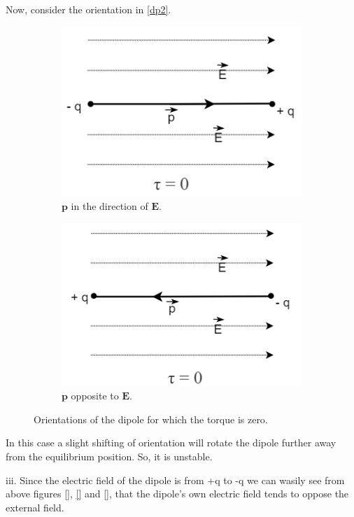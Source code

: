 Now, consider the orientation in \ref{dp2}. \\
\begin{figure}[h]
    \centering
    \begin{subfigure}[b]{0.45\textwidth}
    \centering
    \includegraphics[scale = 0.6]{figures/elecmag/dipoles1.png}
     \caption{$\bm{p}$ in the direction of $\bm{E}$.}
     \label{dp}
    \end{subfigure}
    \hfill
     \begin{subfigure}[b]{0.45\textwidth}
     \centering
    \includegraphics[scale = 0.6]{figures/elecmag/dipoles2.png}
     \caption{$\bm{p}$ opposite to $\bm{E}$.}
     \label{dp}
    \end{subfigure}
     \caption{Orientations of the dipole for which the torque is zero.}
    \label{dipoles}
\end{figure}
In this case a slight shifting of orientation will rotate the dipole further away from the equilibrium position. So, it is unstable.

iii. Since the electric field of the dipole is from +q to -q we can wasily see from above figures \ref{}, \ref{} and \ref{}, that the dipole's own electric field tends to oppose the external field.



